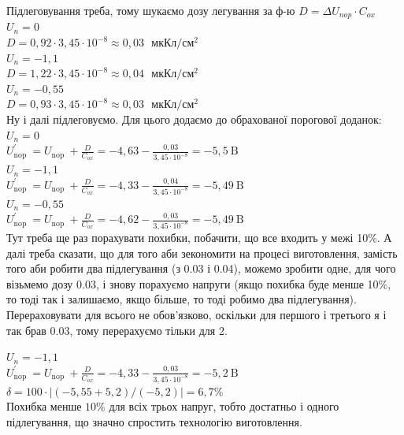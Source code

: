 \documentclass[a4paper,14pt]{extreport}
\begin{document}
Підлеговування треба, тому шукаємо дозу легування за ф-ю $D=\Delta U_{n o p} \cdot C_{o x}$\\
$U_{n}=0$\\
$D=0,92 \cdot 3,45 \cdot 10^{-8} \approx 0,03 \text{ } \text{мкКл} / \text{см}^{2}$\\
$U_{n}=-1,1$\\
$D=1,22 \cdot 3,45 \cdot 10^{-8} \approx 0,04 \text{ } \text{мкКл}  / \text{см}^{2}$\\
$U_{n}=-0,55$\\
$D=0,93 \cdot 3,45 \cdot 10^{-8} \approx 0,03 \text{ } \text{мкКл} / \text{см}^{2}$\\

Ну і далі підлеговуємо. Для цього додаємо до обрахованої порогової доданок:\\
$U_{n}=0$\\
$U_{\text {nop }}^{\prime}=U_{\text {nop }}+\frac{D}{C_{o x}}=-4,63-\frac{0,03}{3,45 \cdot 10^{-8}}=-5,5 \mathrm{~B}$\\
$U_{n}=-1,1$\\
$U_{\text {nop }}^{\prime}=U_{\text {nop }}+\frac{D}{C_{o x}}=-4,33-\frac{0,04}{3,45 \cdot 10^{-8}}=-5,49 \mathrm{~B}$\\
$U_{n}=-0,55$\\
$U_{\text {nop }}^{\prime}=U_{\text {nop }}+\frac{D}{C_{o x}}=-4,62-\frac{0,03}{3,45 \cdot 10^{-8}}=-5,49 \mathrm{~B}$\\

Тут треба ще раз порахувати похибки, побачити, що все входить у межі 10\%. А далі треба сказати, що для того аби зекономити на процесі виготовлення, замість того аби робити два підлегування (з 0.03 і 0.04), можемо зробити одне, для чого візьмемо дозу 0.03, і знову порахуємо напруги (якщо похибка буде менше 10\%, то тоді так і залишаємо, якщо більше, то тоді робимо два підлегування).
Перераховувати для всього не обов’язково, оскільки для першого і третього я і так брав 0.03, тому перерахуємо тільки для 2.

$U_{n}=-1,1$\\

$U_{\text {nop }}^{\prime}=U_{\text {nop }}+\frac{D}{C_{o x}}=-4,33-\frac{0,03}{3,45 \cdot 10^{-8}}=-5,2 \mathrm{~B}$\\

$\delta=100 \cdot|(-5,55+5,2) /(-5,2)|=6,7 \%$\\

Похибка менше $10 \%$ для всіх трьох напруг, тобто достатньо і одного підлегування, що значно спростить технологію виготовлення.
\end{document}
